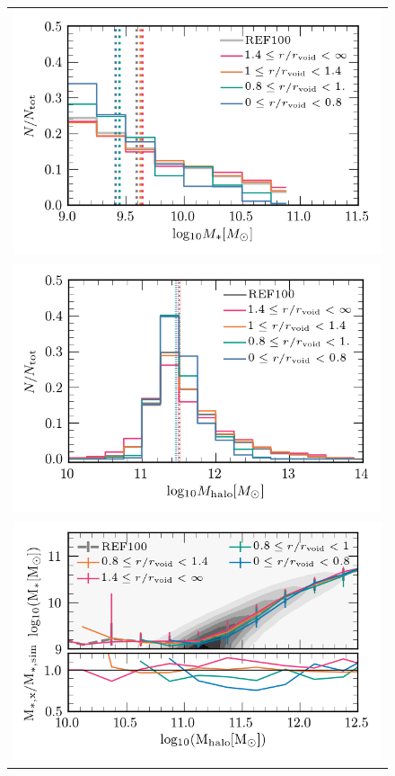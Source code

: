 \documentclass[a4paper,fleqn,usenatbib,letter]{mnras}
\begin{document}
\begin{figure}	
	\begin{tabular}{c}
	\includegraphics[width=1\columnwidth]{plots_parent_sample/GMF_cs_three_regions.png} \\
	\includegraphics[width=1\columnwidth]{plots_parent_sample/HMF_cs_three_regions.png}\\
	\includegraphics[width=0.95\columnwidth]{plots_parent_sample/Mstar_Mhalov2.png} 

\end{tabular}
\end{figure}
\end{document}
